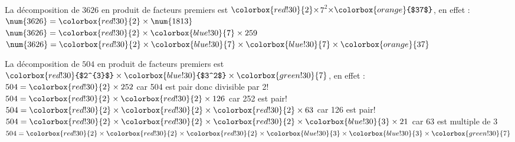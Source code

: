 \begin{exemples*1}
    \phantom{rrr}\\\vspace*{-7mm}
    \begin{minipage}{0.4\linewidth}
        La décomposition de $\num{3626}$ en produit de facteurs premiers est $\colorbox{red!30}{2}\times $\colorbox{blue!30}{$7^2$}$\times \colorbox{orange}{$37$}$, en effet :\\\medskip    
        $\num{3626}=\colorbox{red!30}{2}\times \num{1813}$\\
        $\num{3626}=\colorbox{red!30}{2}\times\colorbox{blue!30}{7}\times 259$\\
        $\num{3626}=\colorbox{red!30}{2}\times\colorbox{blue!30}{7}\times\colorbox{blue!30}{7}\times \colorbox{orange}{37}$
    \end{minipage}
    \hfill
    \begin{minipage}{0.55\linewidth}
        La décomposition de $\num{504}$ en produit de facteurs premiers est $\colorbox{red!30}{$2^{3}$}\times \colorbox{blue!30}{$3^2$}\times \colorbox{green!30}{7}$, en effet :\\\medskip
        $504=\colorbox{red!30}{2}\times 252$ car 504 est pair donc divisible par 2!\\
        $504=\colorbox{red!30}{2}\times\colorbox{red!30}{2}\times 126$ car 252 est pair!\\
        $504=\colorbox{red!30}{2}\times\colorbox{red!30}{2}\times\colorbox{red!30}{2}\times 63$ car 126 est pair!\\
        $504=\colorbox{red!30}{2}\times\colorbox{red!30}{2}\times\colorbox{red!30}{2}\times\colorbox{blue!30}{3}\times 21$ car 63 est multiple de 3\\
        $504=\colorbox{red!30}{2}\times\colorbox{red!30}{2}\times\colorbox{red!30}{2}\times\colorbox{blue!30}{3}\times\colorbox{blue!30}{3}\times \colorbox{green!30}{7}$    
    \end{minipage}
\end{exemples*1}

